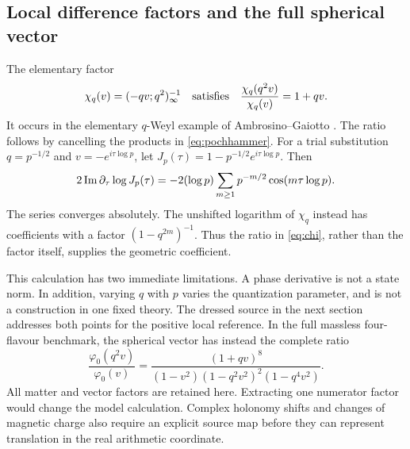 \subsection{Local difference factors and the full spherical vector}
The elementary factor
\begin{equation}\label{eq:chi}
 \chi_q(v)=(-qv;q^2)_\infty^{-1}
 \quad\hbox{satisfies}\quad
 \frac{\chi_q(q^2v)}{\chi_q(v)}=1+qv.
\end{equation}
It occurs in the elementary $q$-Weyl example of
Ambrosino--Gaiotto \cite[Section 3.1.1]{RG}. The ratio follows by
cancelling the products in \eqref{eq:pochhammer}.
For a trial substitution $q=p^{-1/2}$ and $v=-e^{i\tau\log p}$, let
$J_p(\tau)=1-p^{-1/2}e^{i\tau\log p}$. Then
\begin{equation}\label{eq:prime-phase}
 2\operatorname{Im}\partial_\tau\log J_p(\tau)
 =-2(\log p)\sum_{m\geq1}p^{-m/2}\cos(m\tau\log p).
\end{equation}
The series converges absolutely. The unshifted logarithm of $\chi_q$
instead has coefficients with a factor $(1-q^{2m})^{-1}$. Thus the
ratio in \eqref{eq:chi}, rather than the factor itself, supplies the
geometric coefficient.

This calculation has two immediate limitations. A phase derivative
is not a state norm. In addition, varying $q$ with $p$ varies the
quantization parameter, and is not a construction in one fixed theory.
The dressed source in the next section addresses both points for the
positive local reference. In the full massless four-flavour benchmark,
the spherical vector has instead the complete ratio
\begin{equation}\label{eq:full-ratio}
 \frac{\varphi_0(q^2v)}{\varphi_0(v)}
 =\frac{(1+qv)^8}
 {(1-v^2)(1-q^2v^2)^2(1-q^4v^2)}.
\end{equation}
All matter and vector factors are retained here. Extracting one
numerator factor would change the model calculation. Complex holonomy
shifts and changes of magnetic charge also require an explicit source
map before they can represent translation in the real arithmetic
coordinate.

